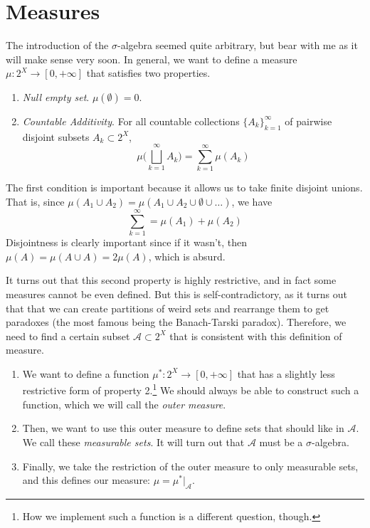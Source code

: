 \section{Measures}  

  The introduction of the $\sigma$-algebra seemed quite arbitrary, but bear with me as it will make sense very soon. In general, we want to define a measure $\mu: 2^X \to [0, +\infty]$ that satisfies two properties. 
  \begin{enumerate}
    \item \textit{Null empty set}. $\mu(\emptyset) = 0$. 
    \item \textit{Countable Additivity}. For all countable collections $\{A_k\}_{k=1}^\infty$ of pairwise disjoint subsets $A_k \subset 2^{X}$, 
    \begin{equation}
      \mu \bigg( \bigsqcup_{k=1}^\infty A_k \bigg) = \sum_{k=1}^\infty \mu(A_k)
    \end{equation}
  \end{enumerate} 

  The first condition is important because it allows us to take finite disjoint unions. That is, since $\mu(A_1 \cup A_2) = \mu(A_1 \cup A_2 \cup \emptyset \cup \ldots)$, we have 
  \begin{equation}
    \sum_{k=1}^\infty = \mu(A_1) + \mu(A_2)
  \end{equation}
  Disjointness is clearly important since if it wasn't, then $\mu(A) = \mu(A \cup A) = 2 \mu(A)$, which is absurd. 

  It turns out that this second property is highly restrictive, and in fact some measures cannot be even defined. But this is self-contradictory, as it turns out that that we can create partitions of weird sets and rearrange them to get paradoxes (the most famous being the Banach-Tarski paradox). Therefore, we need to find a certain subset $\mathcal{A} \subset 2^X$ that is consistent with this definition of measure. 
  
  \begin{enumerate}
    \item We want to define a function $\mu^\ast: 2^X \to [0, +\infty]$ that has a slightly less restrictive form of property 2.\footnote{How we implement such a function is a different question, though.} We should always be able to construct such a function, which we will call the \textit{outer measure}. 

    \item Then, we want to use this outer measure to define sets that should like in $\mathcal{A}$. We call these \textit{measurable sets}. It will turn out that $\mathcal{A}$ must be a $\sigma$-algebra. 

    \item Finally, we take the restriction of the outer measure to only measurable sets, and this defines our measure: $\mu = \mu^\ast \big|_{\mathcal{A}}$.  
  \end{enumerate}

